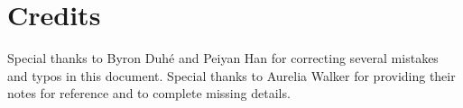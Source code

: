 \section{Credits}

Special thanks to Byron Duh\'{e} and Peiyan Han for correcting several mistakes and typos in this document. Special thanks to Aurelia Walker for providing their notes for reference and to complete missing details.